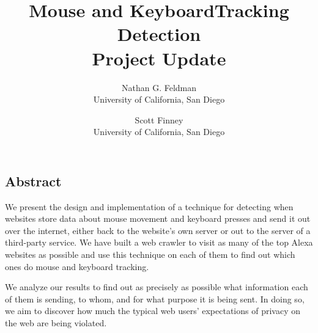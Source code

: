\documentclass[letterpaper,twocolumn,10pt]{article}
\begin{document}
\date{}

\title{\Large \bf Mouse and KeyboardTracking Detection \\ Project Update}

\author{
{\rm Nathan G. Feldman}\\%
University of California, San Diego
\and
{\rm Scott Finney}\\
University of California, San Diego
} %

\maketitle

\thispagestyle{empty}


\subsection*{Abstract}
We present the design and implementation of a technique for detecting when websites store data about mouse movement and keyboard presses and send it out over the internet, either back to the website's own server or out to the server of a third-party service.  We have built a web crawler to visit as many of the top Alexa websites as possible and use this technique on each of them to find out which ones do mouse and keyboard tracking.

We analyze our results to find out as precisely as possible what information each of them is sending, to whom, and for what purpose it is being sent. In doing so, we aim to discover how much the typical web users' expectations of privacy on the web are being violated.
\end{document}
